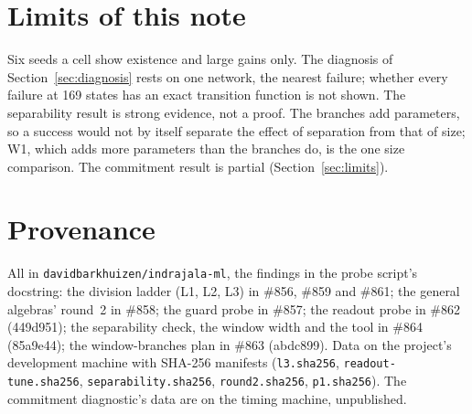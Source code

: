 \documentclass[11pt]{article}
\begin{document}
\section{Limits of this note}

Six seeds a cell show existence and large gains only. The diagnosis of Section~\ref{sec:diagnosis}
rests on one network, the nearest failure; whether every failure at 169 states has an exact
transition function is not shown. The separability result is strong evidence, not a proof. The
branches add parameters, so a success would not by itself separate the effect of separation from
that of size; W1, which adds more parameters than the branches do, is the one size comparison.
The commitment result is partial (Section~\ref{sec:limits}).

\section{Provenance}
\label{sec:provenance}

All in \texttt{davidbarkhuizen/indrajala-ml}, the findings in the probe script's docstring: the
division ladder (L1, L2, L3) in \#856, \#859 and \#861; the general algebras' round~2 in \#858; the
guard probe in \#857; the readout probe in \#862 (449d951); the separability check, the window
width and the tool in \#864 (85a9e44); the window-branches plan in \#863 (abdc899). Data on the
project's development machine with SHA-256 manifests (\texttt{l3.sha256},
\texttt{readout-tune.sha256}, \texttt{separability.sha256}, \texttt{round2.sha256},
\texttt{p1.sha256}). The commitment diagnostic's data are on the timing machine, unpublished.
\end{document}
